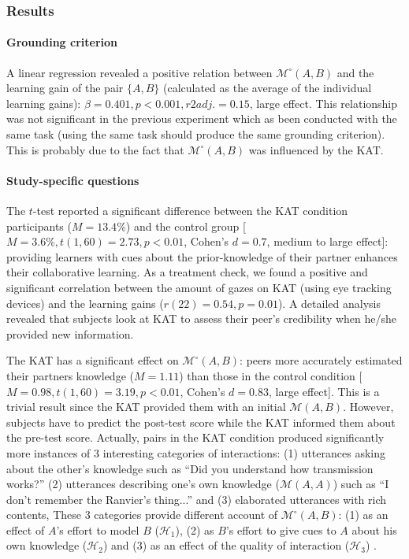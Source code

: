 \documentclass[natbib]{svjour3}
\newcommand{\gmodel}[2]{{$\mathcal{M}(#1, #2)$}}
\newcommand{\gModel}[2]{{$\mathcal{M}^{\circ}(#1, #2)$}}
\begin{document}
\subsubsection*{Results}

\paragraph{Grounding criterion} A linear regression revealed a positive relation
between \gModel{A}{B} and the learning gain of the pair $\{A, B\}$ (calculated
as the average of the individual learning gains): $\beta= 0.401, p < 0.001, r2adj.
= 0.15$, large effect. This relationship was not significant in the previous
experiment which as been conducted with the same task (using the same task
should produce the same grounding criterion). This is probably due to the fact that
\gModel{A}{B} was influenced by the KAT.

\paragraph{Study-specific questions} The $t$-test reported a significant
difference between the KAT condition participants ($M = 13.4\%$) and the control
group [$M = 3.6\%, t(1, 60) = 2.73, p < 0.01$, Cohen's $d = 0.7$, medium to large
effect]: providing learners with cues about the prior-knowledge of their partner
enhances their collaborative learning. As a treatment check, we found a positive
and significant correlation between the amount of gazes on KAT (using eye
tracking devices) and the learning gains ($r(22) = 0.54, p = 0.01$). A detailed
analysis revealed that subjects look at KAT to assess their peer's credibility
when he/she provided new information. 

The KAT has a significant effect on \gModel{A}{B}: peers more accurately
estimated their partners knowledge ($M = 1.11$) than those in the control
condition [$M = 0.98, t(1, 60) = 3.19, p < 0.01$, Cohen's $d = 0.83$, large
effect]. This is a trivial result since the KAT provided them with an initial
\gmodel{A}{B}. However, subjects have to predict the post-test score while the
KAT informed them about the pre-test score. Actually, pairs in the KAT condition
produced significantly more instances of 3 interesting categories of interactions:
 (1) utterances asking about the
other's knowledge such as ``Did you understand how transmission works?'' (2)
utterances describing one's own knowledge (\gmodel{A}{A}) such as ``I don't
remember the Ranvier's thing...'' and (3) elaborated utterances with rich contents,  These 3 categories provide different account
of \gModel{A}{B}: (1) as an
effect of $A$'s effort to model $B$  ($\mathcal{H}_{1}$), (2) as $B$'s effort to give cues to $A$ about his
own knowledge  ($\mathcal{H}_{2}$) and (3) as an effect of the quality of interaction  ($\mathcal{H}_{3}$) .
\end{document}
